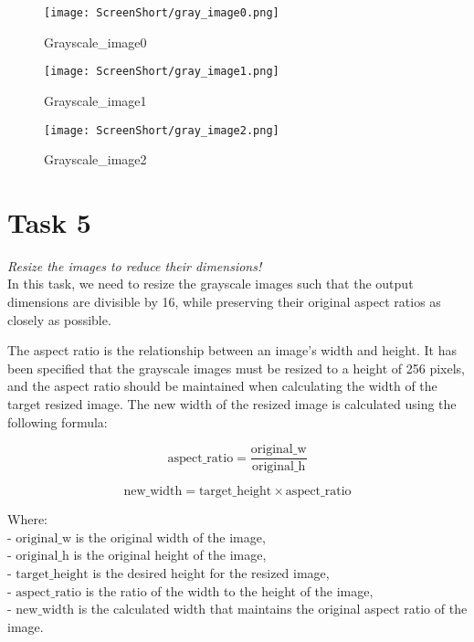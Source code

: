 \documentclass[conference,12pt]{IEEEtran}
\begin{document}
\begin{figure}[h]
    \centering
    \texttt{[image: ScreenShort/gray\_image0.png]}
    \caption{Grayscale\_image0}
\end{figure}

\begin{figure}[h]
    \centering
    \texttt{[image: ScreenShort/gray\_image1.png]}
    \caption{Grayscale\_image1}
\end{figure}

\begin{figure}[h]
    \centering
    \texttt{[image: ScreenShort/gray\_image2.png]}
    \caption{Grayscale\_image2}
\end{figure}
\newpage
\section{Task 5}
\textit{Resize the images to reduce their dimensions!}\\
  In this task, we need to resize the grayscale images such that the output dimensions are divisible by 16, while preserving their original aspect ratios as closely as possible.

The aspect ratio is the relationship between an image's width and height. It has been specified that the grayscale images must be resized to a height of 256 pixels, and the aspect ratio should be maintained when calculating the width of the target resized image. The new width of the resized image is calculated using the following formula:

\begin{equation}
    \text{aspect\_ratio} = \frac{\text{original\_w}}{\text{original\_h}}
\end{equation}

\begin{equation}
    \text{new\_width} = \text{target\_height} \times \text{aspect\_ratio}
\end{equation}

Where:\\
- \(\text{original\_w}\) is the original width of the image,\\
- \(\text{original\_h}\) is the original height of the image,\\
- \(\text{target\_height}\) is the desired height for the resized image,\\
- \(\text{aspect\_ratio}\) is the ratio of the width to the height of the image,\\
- \(\text{new\_width}\) is the calculated width that maintains the original aspect ratio of the image.\\
\end{document}

